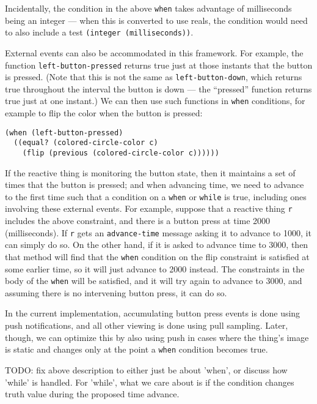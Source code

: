 \documentclass{sig-alternate-05-2015}
\begin{document}
Incidentally, the condition in the above \verb|when| takes advantage of
milliseconds being an integer --- when this is converted to use reals, the
condition would need to also include a test
\verb|(integer (milliseconds))|.

External events can also be accommodated in this framework.  For example,
the function \verb|left-button-pressed| returns true just at those
instants that the button is pressed.  (Note that this is not the same as
\verb|left-button-down|, which returns true throughout the interval
the button is down --- the ``pressed'' function returns true just at one
instant.)  We can then use such functions in \verb|when| conditions, for
example to flip the color when the button is pressed:

\begin{verbatim}
(when (left-button-pressed)
  ((equal? (colored-circle-color c) 
    (flip (previous (colored-circle-color c))))))
\end{verbatim}

If the reactive thing is monitoring the button state, then it maintains a
set of times that the button is pressed; and when advancing time, we need
to advance to the first time such that a condition on a \verb|when| or
\verb|while| is true, including ones involving these external events.  For
example, suppose that a reactive thing \verb|r| includes the above
constraint, and there is a button press at time 2000 (milliseconds).  If
\verb|r| gets an \verb|advance-time| message asking it to advance to 1000,
it can simply do so.  On the other hand, if it is asked to advance time to
3000, then that method will find that the \verb|when| condition on the flip
constraint is satisfied at some earlier time, so it will just advance to
2000 instead.  The constraints in the body of the \verb|when| will be
satisfied, and it will try again to advance to 3000, and assuming there is
no intervening button press, it can do so.

In the current implementation, accumulating button press events is done
using push notifications, and all other viewing is done using pull
sampling.  Later, though, we can optimize this by also using push in cases
where the thing's image is static and changes only at the point a
\verb|when| condition becomes true.

TODO: fix above description to either just be about 'when', or discuss how
'while' is handled.  For 'while', what we care about is if the condition
changes truth value during the proposed time advance.
\end{document}
